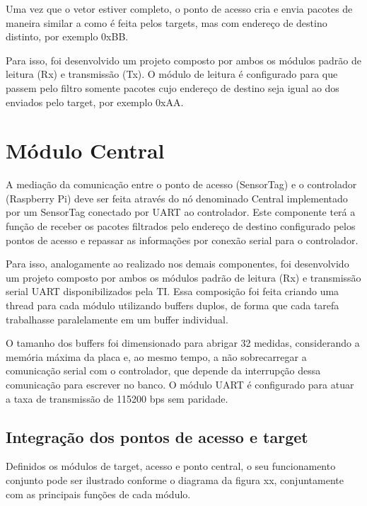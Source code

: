 Uma vez que o vetor estiver completo, o ponto de acesso cria e envia pacotes de maneira similar a como é feita pelos targets, mas com endereço de destino distinto, por exemplo 0xBB.

Para isso, foi desenvolvido um projeto composto por ambos os módulos padrão de leitura (Rx) e transmissão (Tx). O módulo de leitura é configurado para que passem pelo filtro somente pacotes cujo endereço de destino seja igual ao dos enviados pelo target, por exemplo 0xAA.

\section{Módulo Central}

A mediação da comunicação entre o ponto de acesso (SensorTag) e o controlador (Raspberry Pi) deve ser feita através do nó denominado Central implementado por um SensorTag conectado por UART ao controlador.
Este componente terá a função de receber os pacotes filtrados pelo endereço de destino configurado pelos pontos de acesso e repassar as informações por conexão serial para o controlador.

Para isso, analogamente ao realizado nos demais componentes, foi desenvolvido um projeto composto por ambos os módulos padrão de leitura (Rx) e transmissão serial UART disponibilizados pela TI. Essa composição foi feita criando uma thread para cada módulo utilizando buffers duplos, de forma que cada tarefa trabalhasse paralelamente em um buffer individual.

O tamanho dos buffers foi dimensionado para abrigar 32 medidas, considerando a memória máxima da placa e, ao mesmo tempo, a não sobrecarregar a comunicação serial com o controlador, que depende da interrupção dessa comunicação para escrever no banco. O módulo UART é configurado para atuar a taxa de transmissão de 115200 bps sem paridade.

\subsection{Integração dos pontos de acesso e target}

Definidos os módulos de target, acesso e ponto central, o seu funcionamento conjunto pode ser ilustrado conforme o diagrama da figura xx, conjuntamente com as principais funções de cada módulo. 

